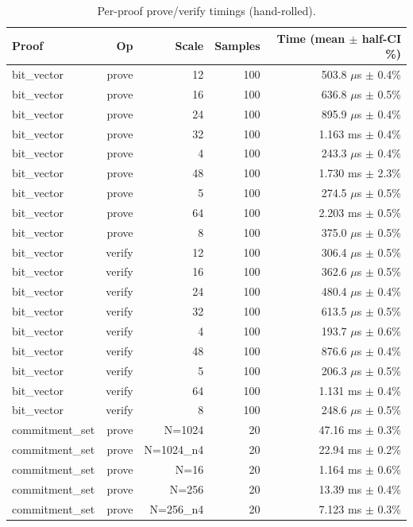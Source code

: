 \begin{table}[h]
  \centering
  \caption{Per-proof prove/verify timings (hand-rolled).}
  \label{tab:g1_proof_primitives}
  \begin{tabular}{lrrrr}
    \toprule
    Proof & Op & Scale & Samples & Time (mean $\pm$ half-CI \%) \\
    \midrule
bit\_vector & prove & 12 & 100 & 503.8 $\mu$s $\pm$ 0.4\% \\
bit\_vector & prove & 16 & 100 & 636.8 $\mu$s $\pm$ 0.5\% \\
bit\_vector & prove & 24 & 100 & 895.9 $\mu$s $\pm$ 0.4\% \\
bit\_vector & prove & 32 & 100 & 1.163 ms $\pm$ 0.4\% \\
bit\_vector & prove & 4 & 100 & 243.3 $\mu$s $\pm$ 0.4\% \\
bit\_vector & prove & 48 & 100 & 1.730 ms $\pm$ 2.3\% \\
bit\_vector & prove & 5 & 100 & 274.5 $\mu$s $\pm$ 0.5\% \\
bit\_vector & prove & 64 & 100 & 2.203 ms $\pm$ 0.5\% \\
bit\_vector & prove & 8 & 100 & 375.0 $\mu$s $\pm$ 0.5\% \\
bit\_vector & verify & 12 & 100 & 306.4 $\mu$s $\pm$ 0.5\% \\
bit\_vector & verify & 16 & 100 & 362.6 $\mu$s $\pm$ 0.5\% \\
bit\_vector & verify & 24 & 100 & 480.4 $\mu$s $\pm$ 0.4\% \\
bit\_vector & verify & 32 & 100 & 613.5 $\mu$s $\pm$ 0.5\% \\
bit\_vector & verify & 4 & 100 & 193.7 $\mu$s $\pm$ 0.6\% \\
bit\_vector & verify & 48 & 100 & 876.6 $\mu$s $\pm$ 0.4\% \\
bit\_vector & verify & 5 & 100 & 206.3 $\mu$s $\pm$ 0.5\% \\
bit\_vector & verify & 64 & 100 & 1.131 ms $\pm$ 0.4\% \\
bit\_vector & verify & 8 & 100 & 248.6 $\mu$s $\pm$ 0.5\% \\
commitment\_set & prove & N=1024 & 20 & 47.16 ms $\pm$ 0.3\% \\
commitment\_set & prove & N=1024\_n4 & 20 & 22.94 ms $\pm$ 0.2\% \\
commitment\_set & prove & N=16 & 20 & 1.164 ms $\pm$ 0.6\% \\
commitment\_set & prove & N=256 & 20 & 13.39 ms $\pm$ 0.4\% \\
commitment\_set & prove & N=256\_n4 & 20 & 7.123 ms $\pm$ 0.3\% \\

\end{tabular}
\end{table}
